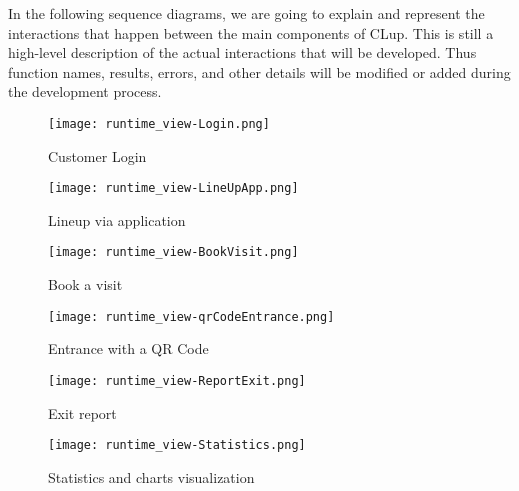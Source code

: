 In the following sequence diagrams, we are going to explain and represent the interactions that happen between the main components of CLup. This is still a high-level description of the actual interactions that will be developed. Thus function names, results, errors, and other details will be modified or added during the development process. 

\begin{figure}[H]
    \centering
    \texttt{[image: runtime\_view-Login.png]}
    \caption{Customer Login}
\end{figure}

\begin{figure}[H]
    \centering
    \texttt{[image: runtime\_view-LineUpApp.png]}
    \caption{Lineup via application}
\end{figure}

\begin{figure}[H]
    \centering
    \texttt{[image: runtime\_view-BookVisit.png]}
    \caption{Book a visit}
\end{figure}

\begin{figure}[H]
    \centering
    \texttt{[image: runtime\_view-qrCodeEntrance.png]}
    \caption{Entrance with a QR Code}
\end{figure}

\begin{figure}[H]
    \centering
    \texttt{[image: runtime\_view-ReportExit.png]}
    \caption{Exit report}
\end{figure}

\begin{figure}[H]
    \centering
    \texttt{[image: runtime\_view-Statistics.png]}
    \caption{Statistics and charts visualization}
\end{figure}